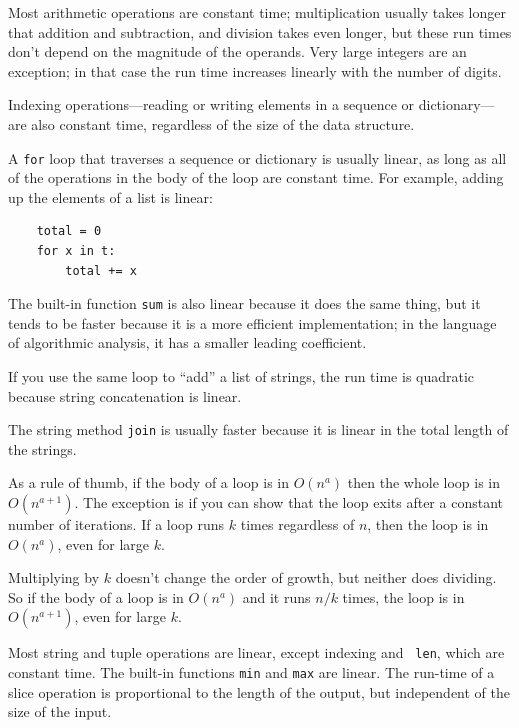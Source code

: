 \documentclass[10pt]{book}
\begin{document}
Most arithmetic operations are constant time; multiplication
usually takes longer that addition and subtraction, and division
takes even longer, but these run times don't
depend on the magnitude of the operands.  Very large integers
are an exception; in that case the run time increases linearly
with the number of digits.

Indexing operations---reading or writing elements in a sequence
or dictionary---are also constant time, regardless of the size
of the data structure.

A {\tt for} loop that traverses a sequence or dictionary is
usually linear, as long as all of the operations in the body
of the loop are constant time.  For example, adding up the
elements of a list is linear:

\begin{verbatim}
    total = 0
    for x in t:
        total += x
\end{verbatim}

The built-in function {\tt sum} is also linear because it does
the same thing, but it tends to be faster because it is a more
efficient implementation; in the language of algorithmic analysis,
it has a smaller leading coefficient.

If you use the same loop to ``add'' a list of strings, the
run time is quadratic
because string concatenation is linear.

The string method {\tt join} is usually faster because it is
linear in the total length of the strings.

As a rule of thumb, if the body of a loop is in $O(n^a)$ then
the whole loop is in $O(n^{a+1})$.  The exception is if you can
show that the loop exits after a constant number of iterations.
If a loop runs $k$ times regardless of $n$, then
the loop is in $O(n^a)$, even for large $k$.

Multiplying by $k$ doesn't change the order of growth, but neither
does dividing.  So if the body of a loop is in $O(n^a)$ and it runs $n
/ k$ times, the loop is in $O(n^{a+1})$, even for large $k$.

Most string and tuple operations are linear, except indexing and {\tt
  len}, which are constant time.  The built-in functions {\tt min} and
{\tt max} are linear.  The run-time of a slice operation is
proportional to the length of the output, but independent of the size
of the input.
\end{document}
